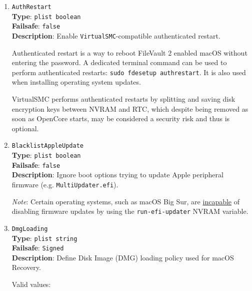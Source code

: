 \documentclass[]{article}
\begin{document}
\begin{enumerate}
\item
  \texttt{AuthRestart}\\
  \textbf{Type}: \texttt{plist\ boolean}\\
  \textbf{Failsafe}: \texttt{false}\\
  \textbf{Description}: Enable \texttt{VirtualSMC}-compatible authenticated restart.

  Authenticated restart is a way to reboot FileVault 2 enabled macOS without entering
  the password. A dedicated terminal command can be used to perform authenticated restarts:
  \texttt{sudo fdesetup authrestart}. It is also used when installing operating system updates.

  VirtualSMC performs authenticated restarts by splitting and saving disk encryption keys between
  NVRAM and RTC, which despite being removed as soon as OpenCore starts, may be
  considered a security risk and thus is optional.

\item
  \texttt{BlacklistAppleUpdate}\\
  \textbf{Type}: \texttt{plist\ boolean}\\
  \textbf{Failsafe}: \texttt{false}\\
  \textbf{Description}: Ignore boot options trying to update Apple peripheral firmware
  (e.g. \texttt{MultiUpdater.efi}).

  \emph{Note}: Certain operating systems, such as macOS Big Sur, are
  \href{https://github.com/acidanthera/bugtracker/issues/1255}{incapable} of
  disabling firmware updates by using the \texttt{run-efi-updater} NVRAM variable.

\item \label{securedmgloading}
  \texttt{DmgLoading}\\
  \textbf{Type}: \texttt{plist\ string}\\
  \textbf{Failsafe}: \texttt{Signed}\\
  \textbf{Description}: Define Disk Image (DMG) loading policy used for macOS Recovery.

  Valid values:


\end{enumerate}
\end{document}
